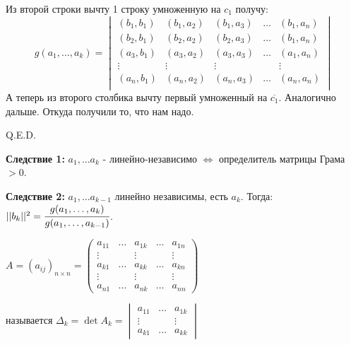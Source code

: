 Из второй строки вычту 1 строку умноженную на $c_1$ получу:
$$g(a_1,\ldots, a_k) = \begin{vmatrix}
    (b_1,b_1) & (b_1, a_2) & (b_1,a_3) & \ldots & (b_1,a_n)\\
     (b_2,b_1) & (b_2, a_2) & (b_2,a_3) & \ldots & (b_1,a_n)\\
      (a_3,b_1) & (a_3, a_2) & (a_3,a_3) & \ldots & (a_1,a_n)\\
      \vdots & \vdots & \vdots & & \vdots \\
       (a_n,b_1) & (a_n, a_2) & (a_n,a_3) & \ldots & (a_n,a_n)\\
\end{vmatrix}$$
А теперь из второго столбика вычту первый умноженный на $\overline{c_1}$. Аналогично дальше. Откуда получили то, что нам надо.

\hfill Q.E.D.

\textbf{Следствие 1:} $a_1,\ldots a_k$ - линейно-независимо $\Leftrightarrow$ определитель матрицы Грама $>0$.

\textbf{Следствие 2:} $a_1,\ldots a_{k-1}$ линейно независимы, есть $a_k$. Тогда: $||b_k||^2 = \cfrac{g(a_1,\ldots ,a_k)}{g(a_1,\ldots,a_{k-1})}$.

 $A = (a_{ij})_{n\times n} = \begin{pmatrix}
        a_{11} & \ldots & a_{1k} & \ldots & a_{1n}\\
        \vdots & & \vdots & & \vdots\\
        a_{k1} & \ldots & a_{kk} & \ldots & a_{kn}\\
        \vdots & & \vdots & & \vdots\\
        a_{n1} & \ldots & a_{nk} &\ldots & a_{nn}
    \end{pmatrix}$

 называется $\Delta_k = \det A_k = \begin{vmatrix}
    a_{11} & \ldots & a_{1k} \\
    \vdots & & \vdots \\
     a_{k1} & \ldots & a_{kk}
\end{vmatrix}$

